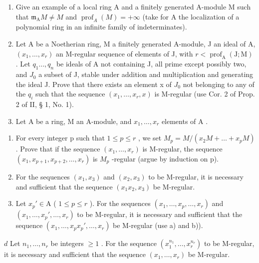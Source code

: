 \begin{enumerate}
\def\labelenumi{\arabic{enumi})}
\setcounter{enumi}{8}
\item
  Give an example of a local ring A and a finitely generated A-module M such that \(\mathfrak{m}_{\mathrm{A}}M \neq M\) and \(\operatorname{prof}_{A}(M) = +\infty\) (take for A the localization of a polynomial ring in an infinite family of indeterminates).
\item
  Let A be a Noetherian ring, M a finitely generated A-module, J an ideal of A, \((x_{1},\ldots,x_{r})\) an M-regular sequence of elements of J, with \(r < \operatorname{prof}_{\mathrm{A}}(\mathrm{J};\mathrm{M})\) . Let \(q_{1}\ldots,q_{n}\) be ideals of A not containing J, all prime except possibly two, and \(J_{0}\) a subset of J, stable under addition and multiplication and generating the ideal J. Prove that there exists an element x of \(J_{0}\) not belonging to any of the \(q_{i}\) such that the sequence \((x_{1},\ldots,x_{r},x)\) is M-regular (use Cor. 2 of Prop. 2 of II, § 1, No. 1).
\item
  Let \(\mathrm{A}\) be a ring, M an \(\mathrm{A}\)-module, and \(x_{1},\ldots ,x_{r}\) elements of \(\mathrm{A}\) .
\end{enumerate}

\begin{enumerate}
\def\labelenumi{\alph{enumi})}
\item
  For every integer p such that \(1 \leqslant p \leqslant r\) , we set \(M_{p} = M/(x_{2}M + \ldots + x_{p}M)\) . Prove that if the sequence \((x_{1}, \ldots, x_{r})\) is M-regular, the sequence \((x_{1}, x_{p+1}, x_{p+2}, \ldots, x_{r})\) is \(M_{p}\) -regular (argue by induction on p).
\item
  For the sequences \((x_{1}, x_{3})\) and \((x_{2}, x_{3})\) to be M-regular, it is necessary and sufficient that the sequence \((x_{1}x_{2}, x_{3})\) be M-regular.
\item
  Let \(x_p' \in \mathrm{A}\) ( \(1 \leqslant p \leqslant r\) ). For the sequences \((x_1, \ldots, x_p, \ldots, x_r)\) and \((x_1, \ldots, x_p', \ldots, x_r)\) to be M-regular, it is necessary and sufficient that the sequence \((x_1, \ldots, x_p x_p', \ldots, x_r)\) be M-regular (use a) and b)).
\end{enumerate}

\(d\) Let \(n_1,\ldots ,n_r\) be integers \(\geqslant 1\) . For the sequence \((x_{1}^{n_{1}},\dots,x_{r}^{n_{r}})\) to be M-regular, it is necessary and sufficient that the sequence \((x_{1},\ldots ,x_{r})\) be M-regular.

